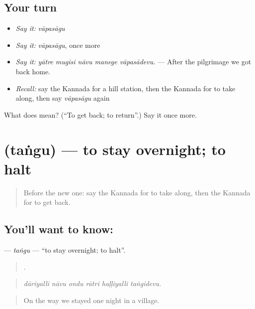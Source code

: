 \subsection*{Your turn}
\begin{itemize}
\raggedright
  \item \emph{Say it:} \emph{vāpasāgu}
  \item \emph{Say it:} \emph{vāpasāgu}, once more
  \item \emph{Say it:} \emph{yātre mugisi nāvu manege vāpasādevu.} — After the pilgrimage we got back home.
  \item \emph{Recall:} say the Kannada for a hill station, then the Kannada for to take along, then say \emph{vāpasāgu} again
\end{itemize}

\begin{tcolorbox}[breakable,colback=teal!4,colframe=teal!35!black,title={Before you move on}]
What does  mean? (\textquotedblleft{}To get back; to return\textquotedblright{}.) Say it once more.
\end{tcolorbox}
\section[\texorpdfstring{\kn{ತಂಗು} (taṅgu)}{ತಂಗು (taṅgu)}]{ (taṅgu) — to stay overnight; to halt}

\label{lesson:KA-C458-tangu}



\begin{quote}
Before the new one: say the Kannada for to take along, then the Kannada for to get back.
\end{quote}

\subsection*{You'll want to know: }
\textbf{} — \emph{taṅgu} — \textquotedblleft{}to stay overnight; to halt\textquotedblright{}.

\begin{quote}
     .
\end{quote}

\begin{quote}
\emph{dāriyalli nāvu ondu rātri haḷḷiyalli taṅgidevu.}
\end{quote}

\begin{quote}
On the way we stayed one night in a village.
\end{quote}

